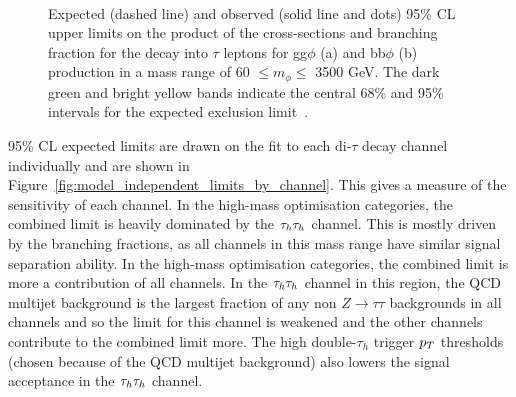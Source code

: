 \begin{figure}[!hbtp]
\centering
     \\
\caption[Plots of the model-independent limits on the cross-sections of gluon fusion and b-associated production multiplied by the $\tau\tau$ branching fraction.]{Expected (dashed line) and observed (solid line and dots) 95\% CL upper limits on the product of the cross-sections and branching fraction for the decay into $\tau$ leptons for gg$\phi$ (a) and bb$\phi$ (b) production in a mass range of 60 $\leq m_{\phi} \leq$ 3500 GeV.  The dark green and bright yellow bands indicate the central 68\% and 95\% intervals for the expected exclusion limit~\cite{CMS:2022rbd}.}
\label{fig:model_independent_limits}
\end{figure}

95\% \ac{CL} expected limits are drawn on the fit to each di-$\tau$ decay channel individually and are shown in Figure~\ref{fig:model_independent_limits_by_channel}.
This gives a measure of the sensitivity of each channel.
In the high-mass optimisation categories, the combined limit is heavily dominated by the $\tau_{h}\tau_{h}$ channel.
This is mostly driven by the branching fractions, as all channels in this mass range have similar signal separation ability.
In the high-mass optimisation categories, the combined limit is more a contribution of all channels. 
In the $\tau_{h}\tau_{h}$ channel in this region, the \ac{QCD} multijet background is the largest fraction of any non $Z\rightarrow\tau\tau$ backgrounds in all channels and so the limit for this channel is weakened and the other channels contribute to the combined limit more.
The high double-$\tau_h$ trigger $p_{T}$ thresholds (chosen because of the \ac{QCD} multijet background) also lowers the signal acceptance in the $\tau_{h}\tau_{h}$ channel. \\

